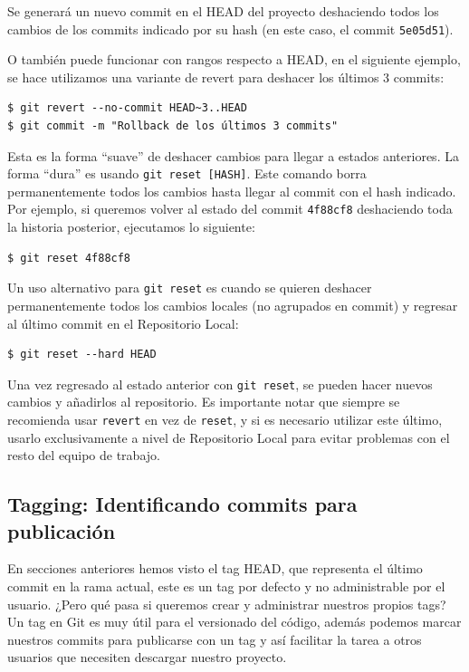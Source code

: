 \documentclass{article}
\begin{document}
Se generará un nuevo commit en el HEAD del proyecto deshaciendo todos los cambios de los commits indicado por su hash (en este caso, el commit \texttt{5e05d51})\cite{undoing}.

O también puede funcionar con rangos respecto a HEAD, en el siguiente ejemplo, se hace utilizamos una variante de revert para deshacer los últimos 3 commits:
\begin{verbatim}
$ git revert --no-commit HEAD~3..HEAD
$ git commit -m "Rollback de los últimos 3 commits"
\end{verbatim}

Esta es la forma ``suave'' de deshacer cambios para llegar a estados anteriores. La forma ``dura'' es usando \texttt{git reset [HASH]}. Este comando borra permanentemente todos los cambios hasta llegar al commit con el hash indicado. Por ejemplo, si queremos volver al estado del commit \texttt{4f88cf8} deshaciendo toda la historia posterior, ejecutamos lo siguiente:
\begin{verbatim}
$ git reset 4f88cf8
\end{verbatim}

Un uso alternativo para \texttt{git reset} es cuando se quieren deshacer permanentemente todos los cambios locales (no agrupados en commit) y regresar al último commit en el Repositorio Local:
\begin{verbatim}
$ git reset --hard HEAD
\end{verbatim}

Una vez regresado al estado anterior con \texttt{git reset}, se pueden hacer nuevos cambios y añadirlos al repositorio. Es importante notar que siempre se recomienda usar \texttt{revert} en vez de \texttt{reset}, y si es necesario utilizar este último, usarlo exclusivamente a nivel de Repositorio Local para evitar problemas con el resto del equipo de trabajo.

\pagebreak

\subsection{Tagging: Identificando commits para publicación}\label{tag}
En secciones anteriores hemos visto el tag HEAD, que representa el último commit en la rama actual, este es un tag por defecto y no administrable por el usuario. ¿Pero qué pasa si queremos crear y administrar nuestros propios tags? Un tag en Git es muy útil para el versionado del código, además podemos marcar nuestros commits para publicarse con un tag y así facilitar la tarea a otros usuarios que necesiten descargar nuestro proyecto.
\end{document}
